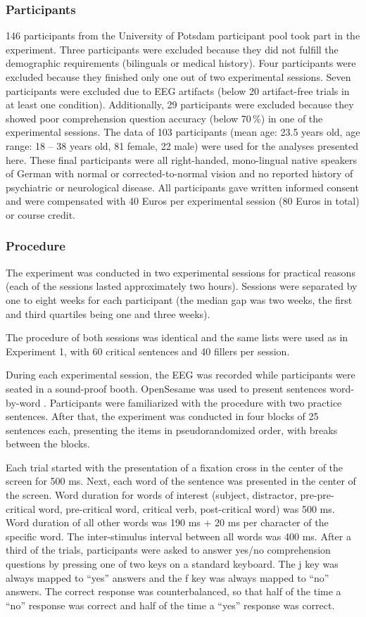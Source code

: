 \documentclass[review,preprint,12pt,authoryear,floatsintext]{elsarticle}
\begin{document}
\subsubsection{Participants}
146 participants from the University of Potsdam participant pool took part in the experiment. Three participants were excluded because they did not fulfill the demographic requirements (bilinguals or medical history). Four participants were excluded because they finished only one out of two experimental sessions. Seven participants were excluded due to EEG artifacts (below 20 artifact-free trials in at least one condition). Additionally, 29 participants were excluded because they showed poor comprehension question accuracy (below 70\,\%) in one of the experimental sessions. The data of 103 participants (mean age: 23.5 years old, age range: 18 -- 38 years old, 81 female, 22 male) were used for the analyses presented here. These final participants were all right-handed, mono-lingual native speakers of German with normal or corrected-to-normal vision and no reported history of psychiatric or neurological disease. All participants gave written informed consent and were compensated with 40 Euros per experimental session (80 Euros in total) or course credit.

\subsubsection{Procedure}
The experiment was conducted in two experimental sessions for practical reasons (each of the sessions lasted approximately two hours). Sessions were separated by one to eight weeks for each participant (the median gap was two weeks, the first and third quartiles being one and three weeks). {The procedure of both sessions was identical and the same lists were used as in Experiment 1, with 60 critical sentences and 40 fillers per session.

During each experimental session, the EEG was recorded while participants were seated in a sound-proof booth. OpenSesame was used to present sentences word-by-word \citep{opensesame}. Participants were familiarized with the procedure with two practice sentences. After that, the experiment was conducted in four blocks of 25 sentences each, presenting the items in pseudorandomized order, with breaks between the blocks.}\label{fillers2} Each trial started with the presentation of a fixation cross in the center of the screen for 500 ms. Next, each word of the sentence was presented in the center of the screen. Word duration for words of interest (subject, distractor, pre-pre-critical word, pre-critical word, critical verb, post-critical word) was 500 ms. Word duration of all other words was 190 ms + 20 ms per character of the specific word. The inter-stimulus interval between all words was 400 ms. After a third of the trials, participants were asked to answer yes/no comprehension questions by pressing one of two keys on a standard keyboard. The j key was always mapped to ``yes'' answers and the f key was always mapped to ``no'' answers. The correct response was counterbalanced, so that half of the time a ``no'' response was correct and half of the time a ``yes'' response was correct.
\end{document}
